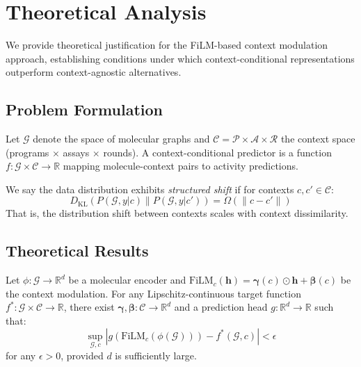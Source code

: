 \documentclass[runningheads]{llncs}
\begin{document}
\section{Theoretical Analysis}
\label{app:theory}

We provide theoretical justification for the FiLM-based context modulation approach, establishing conditions under which context-conditional representations outperform context-agnostic alternatives.

\subsection{Problem Formulation}

\begin{definition}
Let $\mathcal{G}$ denote the space of molecular graphs and $\mathcal{C} = \mathcal{P} \times \mathcal{A} \times \mathcal{R}$ the context space (programs $\times$ assays $\times$ rounds). A context-conditional predictor is a function $f: \mathcal{G} \times \mathcal{C} \rightarrow \mathbb{R}$ mapping molecule-context pairs to activity predictions.
\end{definition}

\begin{definition}
We say the data distribution exhibits \textit{structured shift} if for contexts $c, c' \in \mathcal{C}$:
\begin{equation}
    D_{\text{KL}}\left( P(\mathcal{G}, y | c) \| P(\mathcal{G}, y | c') \right) = \Omega(\|c - c'\|)
\end{equation}
That is, the distribution shift between contexts scales with context dissimilarity.
\end{definition}

\subsection{Theoretical Results}

\begin{theorem}
\label{thm:expressiveness}
Let $\phi: \mathcal{G} \rightarrow \mathbb{R}^d$ be a molecular encoder and $\text{FiLM}_c(\mathbf{h}) = \boldsymbol{\gamma}(c) \odot \mathbf{h} + \boldsymbol{\beta}(c)$ be the context modulation. For any Lipschitz-continuous target function $f^*: \mathcal{G} \times \mathcal{C} \rightarrow \mathbb{R}$, there exist $\boldsymbol{\gamma}, \boldsymbol{\beta}: \mathcal{C} \rightarrow \mathbb{R}^d$ and a prediction head $g: \mathbb{R}^d \rightarrow \mathbb{R}$ such that:
\begin{equation}
    \sup_{\mathcal{G}, c} \left| g(\text{FiLM}_c(\phi(\mathcal{G}))) - f^*(\mathcal{G}, c) \right| < \epsilon
\end{equation}
for any $\epsilon > 0$, provided $d$ is sufficiently large.
\end{theorem}
\end{document}
